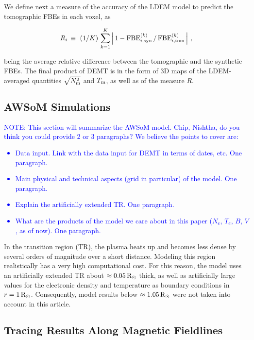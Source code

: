 \documentclass[namedreferences]{solarphysics}
\newcommand{\mrsun}{{\rm R_\odot}}
\newcommand{\FBE}{{\rm FBE}}
\newcommand{\Tm}{T_{\rm m}}
\newcommand{\Nsqm}{N^2_{{\rm m}}}
\newcommand{\sqravgN}{\sqrt{\Nsqm}}
\def\notebyalbert#1{\textcolor{blue}{NOTE: #1}}
\begin{document}
\begin{article}
We define next a measure of the accuracy of the LDEM model to predict the tomographic FBEs in each voxel, as

\begin{equation}\label{R}
R_i \, \equiv \ (1/K) \, \sum_{k=1}^K \left| \, 1 - \FBE^{(k)}_{i,\rm syn}\,/\,\FBE^{(k)}_{i,\rm tom}\, \right| \,,
\end{equation}

\noindent 
{being the} average relative difference between the tomographic and the synthetic FBEs. {The final product of DEMT is in the form of 3D maps of the LDEM-averaged quantities $\sqravgN$ and $\Tm$, as well as of the measure $R$.}

\subsection{{AWSoM Simulations}}\label{awsom} 

\noindent\notebyalbert{This section will summarize the AWSoM model. Chip, Nishtha, do you think you could provide 2 or 3 paragraphs? We believe the points to cover are:
\begin{itemize}
  \item Data input. Link with the data input for DEMT in terms of dates, etc. One paragraph.
  \item Main physical and technical aspects (grid in particular) of the model.  One paragraph. 
  \item Explain the artificially extended TR. One paragraph.
  \item What are the products of the model we care about in this paper ($N_e$, $T_e$, $B$, $V$, as of now). One paragraph.
\end{itemize}
}

In the transition region {(TR)}, the plasma heats up and becomes less dense {by} several orders of magnitude {over} a short distance. Modeling this region {realistically has a very high computational cost}. For this {reason,} the model uses {an artificially} extended {TR about $\approx 0.05\,\mrsun$ thick, as well as artificially large values for the electronic density and temperature as boundary conditions in $r=1\,\mrsun$.} Consequently, model results below {$\approx 1.05\,\mrsun$} were not taken into account in this article.

\subsection{{Tracing Results Along Magnetic Fieldlines}}\label{trace} 


\end{article}
\end{document}
